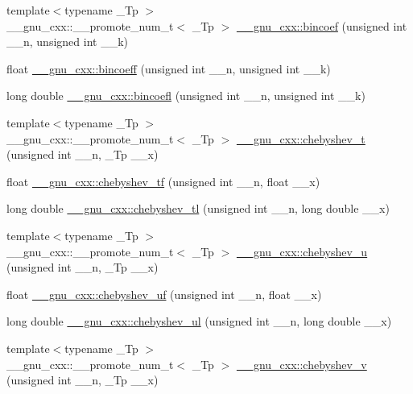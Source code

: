 \begin{DoxyCompactItemize}
{\footnotesize template$<$typename \+\_\+\+Tp $>$ }\\\+\_\+\+\_\+gnu\+\_\+cxx\+::\+\_\+\+\_\+promote\+\_\+num\+\_\+t$<$ \+\_\+\+Tp $>$ \hyperlink{group__gnu__math__spec__func_ga57a15003ded8e0e808b21d4a17a7803e}{\+\_\+\+\_\+gnu\+\_\+cxx\+::bincoef} (unsigned int \+\_\+\+\_\+n, unsigned int \+\_\+\+\_\+k)
\item 
float \hyperlink{group__gnu__math__spec__func_ga20ff8c4c82808c78c299634d02f3f8bd}{\+\_\+\+\_\+gnu\+\_\+cxx\+::bincoeff} (unsigned int \+\_\+\+\_\+n, unsigned int \+\_\+\+\_\+k)
\item 
long double \hyperlink{group__gnu__math__spec__func_ga6874da4660b1ef35c03e28bf09e81796}{\+\_\+\+\_\+gnu\+\_\+cxx\+::bincoefl} (unsigned int \+\_\+\+\_\+n, unsigned int \+\_\+\+\_\+k)
\item 
{\footnotesize template$<$typename \+\_\+\+Tp $>$ }\\\+\_\+\+\_\+gnu\+\_\+cxx\+::\+\_\+\+\_\+promote\+\_\+num\+\_\+t$<$ \+\_\+\+Tp $>$ \hyperlink{group__gnu__math__spec__func_gad8769048d3a0eb2adcfcfeaa10af37fe}{\+\_\+\+\_\+gnu\+\_\+cxx\+::chebyshev\+\_\+t} (unsigned int \+\_\+\+\_\+n, \+\_\+\+Tp \+\_\+\+\_\+x)
\item 
float \hyperlink{group__gnu__math__spec__func_gab8cdb55702d9c8b85af4ecc3d8c6a134}{\+\_\+\+\_\+gnu\+\_\+cxx\+::chebyshev\+\_\+tf} (unsigned int \+\_\+\+\_\+n, float \+\_\+\+\_\+x)
\item 
long double \hyperlink{group__gnu__math__spec__func_ga0c421700d244cdf58e3ac5ff267664d1}{\+\_\+\+\_\+gnu\+\_\+cxx\+::chebyshev\+\_\+tl} (unsigned int \+\_\+\+\_\+n, long double \+\_\+\+\_\+x)
\item 
{\footnotesize template$<$typename \+\_\+\+Tp $>$ }\\\+\_\+\+\_\+gnu\+\_\+cxx\+::\+\_\+\+\_\+promote\+\_\+num\+\_\+t$<$ \+\_\+\+Tp $>$ \hyperlink{group__gnu__math__spec__func_ga59e3a6dd4d614f6e158a0a56fa25a0b1}{\+\_\+\+\_\+gnu\+\_\+cxx\+::chebyshev\+\_\+u} (unsigned int \+\_\+\+\_\+n, \+\_\+\+Tp \+\_\+\+\_\+x)
\item 
float \hyperlink{group__gnu__math__spec__func_ga4b28c2a079eae2e9612c9902801ca256}{\+\_\+\+\_\+gnu\+\_\+cxx\+::chebyshev\+\_\+uf} (unsigned int \+\_\+\+\_\+n, float \+\_\+\+\_\+x)
\item 
long double \hyperlink{group__gnu__math__spec__func_ga11ec202d6aacafba1182e962ecf02978}{\+\_\+\+\_\+gnu\+\_\+cxx\+::chebyshev\+\_\+ul} (unsigned int \+\_\+\+\_\+n, long double \+\_\+\+\_\+x)
\item 
{\footnotesize template$<$typename \+\_\+\+Tp $>$ }\\\+\_\+\+\_\+gnu\+\_\+cxx\+::\+\_\+\+\_\+promote\+\_\+num\+\_\+t$<$ \+\_\+\+Tp $>$ \hyperlink{group__gnu__math__spec__func_gaf5e47fa5f24acf2aac6c7a1187ee6be1}{\+\_\+\+\_\+gnu\+\_\+cxx\+::chebyshev\+\_\+v} (unsigned int \+\_\+\+\_\+n, \+\_\+\+Tp \+\_\+\+\_\+x)

\end{DoxyCompactItemize}
